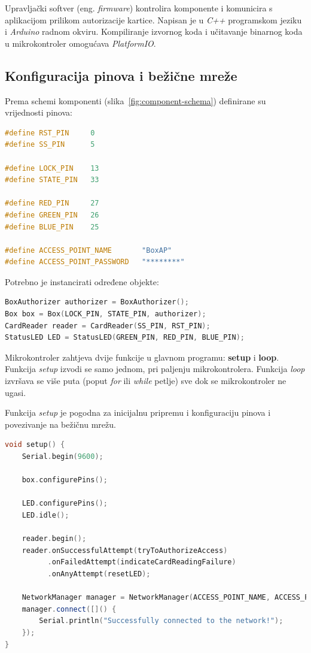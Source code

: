 Upravljački softver (eng. \textit{firmware}) kontrolira komponente i komunicira s aplikacijom prilikom autorizacije
kartice.
Napisan je u \textit{C++} programskom jeziku i \textit{Arduino} radnom okviru.
Kompiliranje izvornog koda i učitavanje binarnog koda u mikrokontroler omogućava \textit{PlatformIO}.

\subsection{Konfiguracija pinova i bežične mreže}

Prema schemi komponenti (slika~\ref{fig:component-schema}) definirane su vrijednosti pinova:

\begin{lstlisting}[language=C++]
#define RST_PIN     0
#define SS_PIN      5

#define LOCK_PIN    13
#define STATE_PIN   33

#define RED_PIN     27
#define GREEN_PIN   26
#define BLUE_PIN    25

#define ACCESS_POINT_NAME       "BoxAP"
#define ACCESS_POINT_PASSWORD   "********"
\end{lstlisting}

Potrebno je instancirati određene objekte:

\begin{lstlisting}[language=C++]
BoxAuthorizer authorizer = BoxAuthorizer();
Box box = Box(LOCK_PIN, STATE_PIN, authorizer);
CardReader reader = CardReader(SS_PIN, RST_PIN);
StatusLED LED = StatusLED(GREEN_PIN, RED_PIN, BLUE_PIN);
\end{lstlisting}

Mikrokontroler zahtjeva dvije funkcije u glavnom programu: \textbf{setup} i \textbf{loop}.
Funkcija \textit{setup} izvodi se samo jednom, pri paljenju mikrokontrolera.
Funkcija \textit{loop} izvršava se više puta (poput \textit{for} ili \textit{while} petlje) sve dok se mikrokontroler
ne ugasi.

Funkcija \textit{setup} je pogodna za inicijalnu pripremu i konfiguraciju pinova i povezivanje na bežičnu mrežu.

\begin{lstlisting}[language=C++]
void setup() {
    Serial.begin(9600);

    box.configurePins();

    LED.configurePins();
    LED.idle();

    reader.begin();
    reader.onSuccessfulAttempt(tryToAuthorizeAccess)
          .onFailedAttempt(indicateCardReadingFailure)
          .onAnyAttempt(resetLED);

    NetworkManager manager = NetworkManager(ACCESS_POINT_NAME, ACCESS_POINT_PASSWORD);
    manager.connect([]() {
        Serial.println("Successfully connected to the network!");
    });
}
\end{lstlisting}

